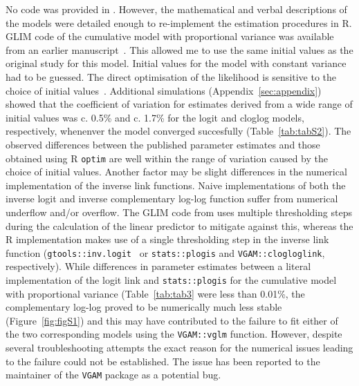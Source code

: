 No code was provided in \citep{candy1991modeling}. 
However, the mathematical and verbal descriptions of the models were detailed enough to re-implement the estimation procedures in R. 
GLIM code of the cumulative model with proportional variance was available from an earlier manuscript~\citep{candy1990biology}. 
This allowed me to use the same initial values as the original study for this model. 
Initial values for the model with constant variance had to be guessed.
The direct optimisation of the likelihood is sensitive to the choice of initial values~\citep{dennis1986stochastic}. 
Additional simulations (Appendix~\ref{sec:appendix}) showed that the coefficient of variation for estimates derived from a wide range of initial values was c. 0.5\% and c. 1.7\% for the logit and cloglog models, respectively, whenenver the model converged succesfully (Table~\ref{tab:tabS2}).
The observed differences between the published parameter estimates and those obtained using R \verb+optim+ are well within the range of variation caused by the choice of initial values.
Another factor may be slight differences in the numerical implementation of the inverse link functions. 
Naive implementations of both the inverse logit and inverse complementary log-log function suffer from numerical underflow and/or overflow. 
The GLIM code from \citep{candy1990biology} uses multiple thresholding steps during the calculation of the linear predictor to mitigate against this, whereas the R implementation makes use of a single thresholding step in the inverse link function (\verb+gtools::inv.logit+~\citep{gtools} or \verb+stats::plogis+ and \verb+VGAM::clogloglink+, respectively). 
While differences in parameter estimates between a literal implementation of the logit link and  \verb+stats::plogis+ for the cumulative model with proportional variance (Table~\ref{tab:tab3} were less than 0.01\%, the complementary log-log proved to be numerically much less stable (Figure~\ref{fig:figS1}) and this may have contributed to the failure to fit either of the two corresponding models using the \verb+VGAM::vglm+ function. 
However, despite several troubleshooting attempts the exact reason for the numerical issues leading to the failure could not be established.
The issue has been reported to the maintainer of the \verb+VGAM+ package as a potential bug.

\afterpage{\clearpage}
